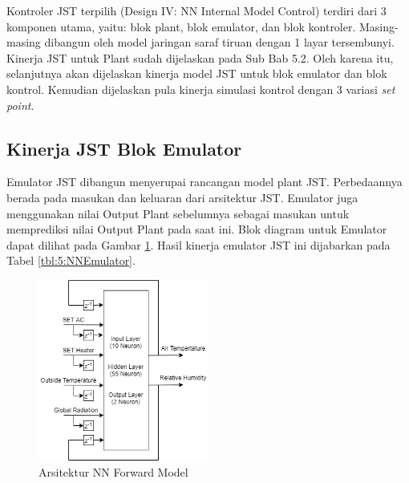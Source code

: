 Kontroler JST terpilih (Design IV: NN Internal Model Control) terdiri dari 3 komponen utama, yaitu: blok plant, blok emulator, dan blok kontroler. Masing-masing dibangun oleh model jaringan saraf tiruan dengan 1 layar tersembunyi. Kinerja JST untuk Plant sudah dijelaskan pada Sub Bab 5.2. Oleh karena itu, selanjutnya akan dijelaskan kinerja model JST untuk blok emulator dan blok kontrol. Kemudian dijelaskan pula kinerja simulasi kontrol dengan 3 variasi \textit{set point}.

\subsection{Kinerja JST Blok Emulator}

Emulator JST dibangun menyerupai rancangan model plant JST. Perbedaannya berada pada masukan dan keluaran dari arsitektur JST. Emulator juga menggunakan nilai Output Plant sebelumnya sebagai masukan untuk memprediksi nilai Output Plant pada saat ini. Blok diagram untuk Emulator dapat dilihat pada Gambar \ref{fig:5:NNForwardModelDesign}. Hasil kinerja emulator JST ini dijabarkan pada Tabel \ref{tbl:5:NNEmulator}.

\begin{figure}[!h]
	\centering
	\includegraphics[width=0.5\textwidth]{figures/NNForwardModelDesign}
	\caption{Arsitektur NN Forward Model}
	\label{fig:5:NNForwardModelDesign}
\end{figure}
\vspace{-1em}

